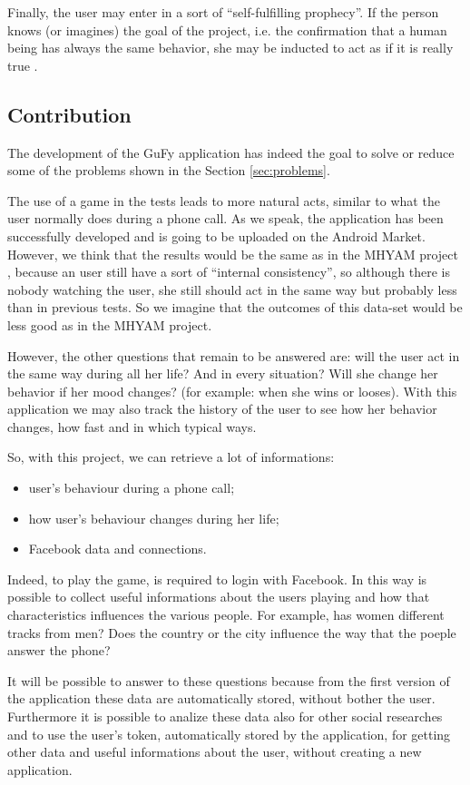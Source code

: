Finally, the user may enter in a sort of ``self-fulfilling prophecy''. If the person knows (or imagines) the goal of the project, i.e. the  confirmation that a human being has always the same behavior, she may be inducted to act as if it is really true \cite{influence}.

\subsection{Contribution}
\label{sec:contribution}
The development of the GuFy application has indeed the goal to solve or reduce some of the problems shown in the Section \ref{sec:problems}.

The use of a game in the tests leads to more natural acts, similar to what the user normally does during a phone call. As we speak, the application has been successfully developed and is going to be uploaded on the Android Market. However, we think that the results would be the same as in the MHYAM project \cite{MHYAM}, because an user still have a sort of ``internal consistency'', so although there is nobody watching the user, she still should act in the same way but probably less than in previous tests. So we imagine that the outcomes of this data-set would be less good as in the MHYAM project. 

However, the other questions that remain to be answered are: will the user act in the same way during all her life? And in every situation? Will she change her behavior if her mood changes? (for example: when she wins or looses). With this application we may also track the history of the user to see how her behavior changes, how fast and in which typical ways. 

So, with this project, we can retrieve a lot of informations:
\begin{itemize}
\item user's behaviour during a phone call;
\item how user's behaviour changes during her life;
\item Facebook data and connections.
\end{itemize}

Indeed, to play the game, is required to login with Facebook. In this way is possible to collect useful informations about the users playing and how that characteristics influences the various people. For example, has women different tracks from men? Does the country or the city influence the way that the poeple answer the phone?

It will be possible to answer to these questions because from the first version of the application these data are automatically stored, without bother the user. Furthermore it is possible to analize these data also for other social researches and to use the user's token, automatically stored by the application, for getting other data and useful informations about the user, without creating a new application.

